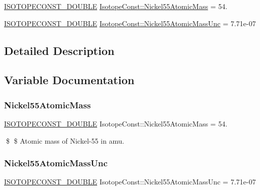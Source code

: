 \begin{DoxyCompactItemize}
\item 
\mbox{\hyperlink{group___isotope_const-_macros_ga8f45a7272ce02c0b4c65c44636ed719a}{I\+S\+O\+T\+O\+P\+E\+C\+O\+N\+S\+T\+\_\+\+D\+O\+U\+B\+LE}} \mbox{\hyperlink{group___isotope_const-_nickel-_ni55_gab5a6522bf46cb73f34ca0dfe2545f303}{Isotope\+Const\+::\+Nickel55\+Atomic\+Mass}} = 54.
\item 
\mbox{\hyperlink{group___isotope_const-_macros_ga8f45a7272ce02c0b4c65c44636ed719a}{I\+S\+O\+T\+O\+P\+E\+C\+O\+N\+S\+T\+\_\+\+D\+O\+U\+B\+LE}} \mbox{\hyperlink{group___isotope_const-_nickel-_ni55_ga8fa525af1dc7ddc5255d6b616c8c93b2}{Isotope\+Const\+::\+Nickel55\+Atomic\+Mass\+Unc}} = 7.\+71e-\/07
\end{DoxyCompactItemize}


\subsection{Detailed Description}


\subsection{Variable Documentation}
\mbox{\label{group___isotope_const-_nickel-_ni55_gab5a6522bf46cb73f34ca0dfe2545f303}} 
\subsubsection{\texorpdfstring{Nickel55\+Atomic\+Mass}{Nickel55AtomicMass}}
{\footnotesize\ttfamily \mbox{\hyperlink{group___isotope_const-_macros_ga8f45a7272ce02c0b4c65c44636ed719a}{I\+S\+O\+T\+O\+P\+E\+C\+O\+N\+S\+T\+\_\+\+D\+O\+U\+B\+LE}} Isotope\+Const\+::\+Nickel55\+Atomic\+Mass = 54.}

\$ \$ Atomic mass of Nickel-\/55 in amu. \mbox{\label{group___isotope_const-_nickel-_ni55_ga8fa525af1dc7ddc5255d6b616c8c93b2}} 
\subsubsection{\texorpdfstring{Nickel55\+Atomic\+Mass\+Unc}{Nickel55AtomicMassUnc}}
{\footnotesize\ttfamily \mbox{\hyperlink{group___isotope_const-_macros_ga8f45a7272ce02c0b4c65c44636ed719a}{I\+S\+O\+T\+O\+P\+E\+C\+O\+N\+S\+T\+\_\+\+D\+O\+U\+B\+LE}} Isotope\+Const\+::\+Nickel55\+Atomic\+Mass\+Unc = 7.\+71e-\/07}

